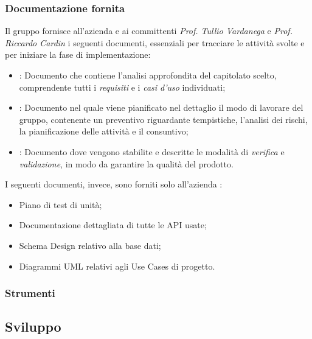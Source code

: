 \subsubsection{Documentazione fornita} %
Il gruppo fornisce all'azienda \proponente{} e ai committenti \textit{Prof. Tullio Vardanega} e \textit{Prof. Riccardo Cardin} i seguenti documenti, essenziali per tracciare le attività svolte e per iniziare la fase di implementazione:
\begin{itemize}
	\item \AdR{}: Documento che contiene l'analisi approfondita del capitolato scelto, comprendente tutti i \emph{requisiti} e i \emph{casi d'uso} individuati;
	\item \PdP{}: Documento nel quale viene pianificato nel dettaglio il modo di lavorare del gruppo, contenente un preventivo riguardante tempistiche, l'analisi dei rischi, la pianificazione delle attività e il consuntivo;
	\item \PdQ{}: Documento dove vengono stabilite e descritte le modalità di \emph{verifica} e \emph{validazione}, in modo da garantire la qualità del prodotto.  \\
\end{itemize}
I seguenti documenti, invece, sono forniti solo all'azienda \proponente{}:	%
\begin{itemize}
	\item Piano di test di unità;
	\item Documentazione dettagliata di tutte le API usate;
	\item Schema Design relativo alla base dati;
	\item Diagrammi UML relativi agli Use Cases di progetto. %
\end{itemize}

\subsubsection{Strumenti} %

\subsection{Sviluppo}

